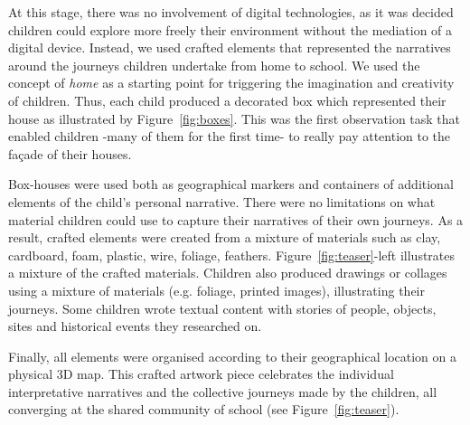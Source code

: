 \documentclass[acmlarge,screen,dvipsnames]{acmart}
\begin{document}
At this stage, there was no involvement of digital technologies, as it was
decided children could explore more freely their environment without the
mediation of a digital device. Instead, we used crafted elements that represented 
the narratives around the journeys children undertake from home to school. 
We used the concept of \emph{home} as a starting point for triggering the imagination and creativity of children. Thus, each child produced a decorated box
which represented their house as illustrated by Figure~\ref{fig:boxes}. This
was the first observation task that enabled children -many of them for the first time-
to really pay attention to the fa\c{c}ade of their houses. 


Box-houses were used both
as geographical markers and containers of additional elements of the child's personal narrative. 
There were no
limitations on what material children could use to capture their narratives of their own journeys.
As a result, crafted elements were created from a mixture of materials such as
clay, cardboard, foam, plastic, wire, foliage, feathers.
Figure~\ref{fig:teaser}-left illustrates a mixture of the crafted materials. Children also produced drawings or collages using a
mixture of materials (e.g. foliage, printed images), illustrating their
journeys. Some children wrote
textual content with stories of people, objects, sites and historical events they
researched on.

Finally, all elements were organised according to their geographical location
on a physical 3D map. This crafted artwork piece celebrates the individual
interpretative narratives and the collective journeys made by the children, all
converging at the shared community of school (see Figure~\ref{fig:teaser}). 



\color{blue}
\end{document}
